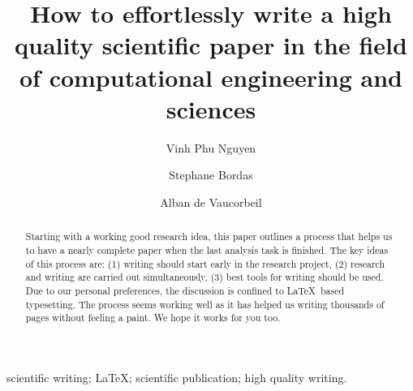\documentclass[authoryear,3p,times,preprint,review,fleqn]{elsarticle}
\numberwithin{equation}{section}
\theoremstyle{remark}
\begin{document}

\begin{frontmatter}



\title{\textbf{How to effortlessly write a high quality scientific paper in the field of computational engineering and sciences }}



\author[1]{Vinh Phu Nguyen}
\author[2]{Stephane Bordas}
\author[3]{Alban de Vaucorbeil}


\address[1]{Department of Civil Engineering, Monash University, Clayton 3800, VIC, Australia}
\address[2]{Institute of Computational Engineering, University of Luxembourg, Faculty of Sciences Communication and Technology, Luxembourg}
\address[3]{Institute for Frontier Materials, Deakin University, Geelong, VIC, 3216, Australia}



\begin{abstract}
Starting with a working good research idea, this paper outlines a process that helps us to have a nearly complete paper when the last analysis task is finished.  The key ideas of this process are: (1) writing should start early in the research project, (2) research and writing are carried out simultaneously, (3) best tools for writing should be used.   Due to our personal preferences, the discussion is confined to \LaTeX\ based typesetting. The process seems working well as it has helped us writing thousands of pages without feeling a paint. We hope it works for you too. 

\end{abstract}


\begin{keyword}
 scientific writing; \LaTeX; scientific publication; high quality writing.
\end{keyword}


\end{frontmatter}
\end{document}
